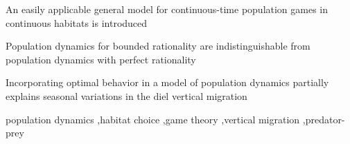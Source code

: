 \documentclass[review]{elsarticle}
\begin{document}
\begin{comment}
\begin{abstract}
  Population dynamics are often modeled without taking behavior into account. This is  in spite of the largest daily feeding times for predators, namely at dawn and dusk, being driven by behavior. The daily pattern stems from the Diel Vertical Migration (DVM) in the aquatic setting and crepuscular behavior in the terrestrial setting. This is usually explained by prey avoiding visual predators, and visual predators seeking to find prey. We develop a game-theoretical model of predator-prey interactions in continuous time and space, finding the Nash equilibrium at every instant. By unifying results for the general resolution of polymatrix games, and a spectral discretization scheme, we can resolve the spatially continuous game nearly instantaneously. Our approach allows a unified model for the slow time-scale of population dynamics, and the fast time-scale of the vertical migration, under seasonal changes. We use the diel vertical migration as a case, examining emergent phenomena from the introduction of the fast dynamics.
  On the behavioral time-scale, we see the emergence of a deep scattering layer from the game dynamics. On the longer time-scale of population dynamics, the introduction of optimal behavior has a strong stabilizing effect, compared to the model without optimal behavior. In a changing seasonal environment, we observe a change in daily migration patterns throughout the seasons, driven by changes in both population and light levels. The framework we propose can easily be adapted to population games in inhomogenous terrestrial environments, and more complex food-webs.
\end{abstract}
\end{comment}
\begin{highlights}\item An easily applicable general model for continuous-time population games in continuous habitats is introduced \item Population dynamics for bounded rationality are indistinguishable from population dynamics with perfect rationality \item Incorporating optimal behavior in a model of population dynamics partially explains seasonal variations in the diel vertical migration \end{highlights}

\begin{keyword} population dynamics \sep habitat choice \sep game theory \sep vertical migration \sep predator-prey %
\end{keyword}
\end{document}
